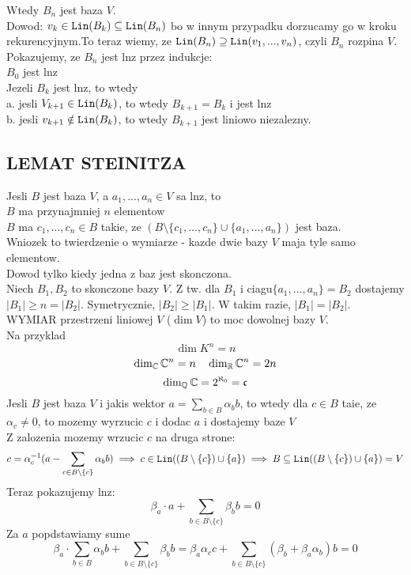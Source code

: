 \documentclass{article}
\begin{document}
    Wtedy $B_n$ jest baza $V$.\medskip\\
    Dowod: $v_k\in\texttt{Lin}({B_k})\subseteq\texttt{Lin}(B_n)$ bo w innym przypadku dorzucamy go w kroku rekurencyjnym.To teraz wiemy, ze $\texttt{Lin}(B_n)\supseteq\texttt{Lin}(v_1, ..., v_n)$, czyli $B_n$ rozpina $V$.\\
    Pokazujemy, ze $B_n$ jest lnz przez indukcje:\\
    $B_0$ jest lnz\\
    Jezeli $B_k$ jest lnz, to wtedy\\
    a. jesli $V_{k+1}\in\texttt{Lin}(B_k)$, to wtedy $B_{k+1}=B_k$ i jest lnz\\
    b. jesli $v_{k+1}\notin \texttt{Lin}(B_k)$, to wtedy $B_{k+1}$ jest liniowo niezalezny. 
\subsection*{LEMAT STEINITZA}
Jesli $B$ jest baza $V$, a $a_1, ..., a_n\in V$ sa lnz, to\\
$B$ ma przynajmniej $n$ elementow\\
$B$ ma $c_1, ..., c_n\in B$ takie, ze $(B\setminus\{c_1, ..., c_n\}\cup\{a_1, ..., a_n\})$ jest baza.\medskip\\
Wniozek to twierdzenie o wymiarze - kazde dwie bazy $V$ maja tyle samo elementow.\\
Dowod tylko kiedy jedna z baz jest skonczona.\\
Niech $B_1, B_2$ to skonczone bazy $V$. Z tw. dla $B_1$ i ciagu$\{a_1, ..., a_n\}=B_2$ dostajemy $|B_1|\geq n=|B_2|$. Symetrycznie, $|B_2|\geq |B_1|$. W takim razie, $|B_1|=|B_2|$. \\
WYMIAR przestrzeni liniowej $V$ ($\dim V$) to moc dowolnej bazy $V$. \\
Na przyklad
$$\dim K^n=n$$
$$\dim_{\mathbb{C}}\mathbb{C}^n=n\quad \dim_{\mathbb{R}}\mathbb{C}^n=2n$$
$$\dim_{\mathbb{Q}}\mathbb{C}=2^{\aleph_0}=\mathfrak{c}$$
Jesli $B$ jest baza $V$ i jakis wektor $a=\sum\limits_{b\in B}\alpha_b b$, to wtedy dla $c\in B$ taie, ze $\alpha_c\neq 0$, to mozemy wyrzucic $c$ i dodac $a$ i dostajemy baze $V$\\
Z zalozenia mozemy wrzucic $c$ na druga strone:
$$c=\alpha_c^{-1}(a-\sum\limits_{c\in B\setminus\{c\}}\alpha_bb) \implies c\in \texttt{Lin}((B\setminus\{c\})\cup\{a\})\implies B\subseteq\texttt{Lin}((B\setminus\{c\})\cup\{a\})=V$$
Teraz pokazujemy lnz:
$$\beta_a\cdot a+\sum\limits_{b\in B\setminus\{c\}}
\beta_bb=0$$
Za $a$ popdstawiamy sume
$$\beta_a\cdot \sum\limits_{b\in B}\alpha_b b+\sum\limits_{b\in B\setminus\{c\}}\beta_bb=\beta_a\alpha_cc+\sum\limits_{b\in B\setminus\{c\}}(\beta_b+\beta_a\alpha_b)b=0$$
\end{document}
